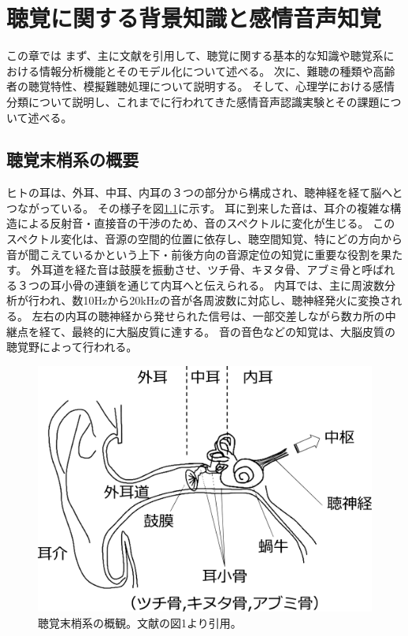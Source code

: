 
\newpage
\chapter{聴覚に関する背景知識と感情音声知覚}
\label{chap:RelatedResearch}

この章では
まず、主に文献\cite{ogushi2019Book, furukawa2021chokaku}を引用して、聴覚に関する基本的な知識や聴覚系における情報分析機能とそのモデル化について述べる。
次に、難聴の種類や高齢者の聴覚特性、模擬難聴処理について説明する。
そして、心理学における感情分類について説明し、これまでに行われてきた感情音声認識実験とその課題について述べる。


\section{聴覚末梢系の概要}
\label{sec:Auditory}
ヒトの耳は、外耳、中耳、内耳の３つの部分から構成され、聴神経を経て脳へとつながっている。
その様子を図\ref{fig:Hearingsystem}に示す。
耳に到来した音は、耳介の複雑な構造による反射音・直接音の干渉のため、音のスペクトルに変化が生じる。
このスペクトル変化は、音源の空間的位置に依存し、聴空間知覚、特にどの方向から音が聞こえているかという上下・前後方向の音源定位の知覚に重要な役割を果たす。
外耳道を経た音は鼓膜を振動させ、ツチ骨、キヌタ骨、アブミ骨と呼ばれる３つの耳小骨の連鎖を通じて内耳へと伝えられる。
内耳では、主に周波数分析が行われ、数10Hzから20kHzの音が各周波数に対応し、聴神経発火に変換される。
左右の内耳の聴神経から発せられた信号は、一部交差しながら数カ所の中継点を経て、最終的に大脳皮質に達する。
音の音色などの知覚は、大脳皮質の聴覚野によって行われる。

\begin{figure}[htbp]
    \vspace{40pt}
    \centering
    \includegraphics[width=0.6\hsize]{Figure/RelatedResearch/furukawa2017auditory.eps}
    \caption{聴覚末梢系の概観。文献\cite{furukawa2017chokaku}の図1より引用。}
    \label{fig:Hearingsystem}
\end{figure}


